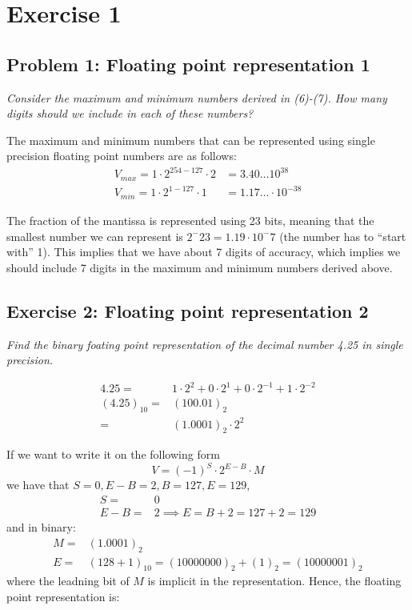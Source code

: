 
\section{Exercise 1} %
\label{sec:exercise_1}

\subsection{Problem 1: Floating point representation 1} %
\label{sec:exercise_1}
\begin{question}
  \emph{Consider the maximum and minimum numbers derived in (6)-(7). How many digits should we include in each of these numbers?}
\end{question}
The maximum and minimum numbers that can be represented using single precision floating point numbers are as follows:
\begin{align}
  V_{max} = 1\cdot 2^{254-127}\cdot 2 & = 3.40\ldots 10^{38} \\
  V_{min} = 1\cdot 2^{1-127}\cdot 1   & = 1.17\ldots \cdot 10^{-38}
\end{align}

The fraction of the mantissa is represented using 23 bits, meaning that the smallest number we can represent is $2^-23 = 1.19\cdot 10^-7$ (the number has to ``start with'' 1). This implies that we have about 7 digits of accuracy, which implies we should include 7 digits in the maximum and minimum numbers derived above.


\subsection{Exercise 2: Floating point representation 2} %
\label{sec:ecercise_2}
\begin{question}
  \emph{Find the binary foating point representation of the decimal number 4.25 in single precision.}
\end{question}
\begin{align}
  4.25        = & 1\cdot 2^2 + 0 \cdot 2^1 + 0\cdot 2^{-1} + 1\cdot 2^{-2} \\
  (4.25)_{10} = & (100.01)_2 \\
              = & (1.0001)_2 \cdot 2^2
\end{align}

If we want to write it on the following form
\begin{equation}
  V = (-1)^S \cdot 2^{E-B} \cdot M
\end{equation}
we have that $S=0, E-B=2, B=127, E=129$,
\begin{align}
  S = & 0 \\
  E-B = & 2 \implies E=B+2=127+2=129
\end{align}
and in binary:
\begin{align}
  M = & (1.0001)_2 \\
  E = & (128 + 1)_{10} = (10000000)_2 + (1)_2 = (10000001)_2
\end{align}
where the leadning bit of $M$ is implicit in the representation. Hence, the floating point representation is:

